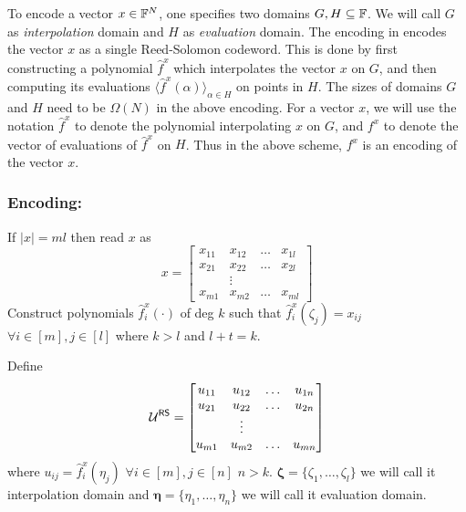 To encode a vector $x\in \mathbb{F}^N$, one specifies two domains $G,H\subseteq \mathbb{F}$.
We will call $G$ as {\em interpolation} domain and $H$ as {\em evaluation} domain.
The encoding in \cite{Aurora} encodes the vector $x$ as a single Reed-Solomon
codeword. This is done by first constructing a polynomial $\hat{f}^x$ which
interpolates the vector $x$ on $G$, and then computing its evaluations
$\langle \hat{f}^x(\alpha) \rangle_{\alpha\in H}$ on points in $H$. The sizes
of domains $G$ and $H$ need to be $\Omega(N)$ in the above encoding. For a
vector $x$, we will use the notation $\hat{f}^x$ to denote the polynomial
interpolating $x$ on $G$, and $f^x$ to denote the vector of evaluations of
$\hat{f}^x$ on $H$. Thus in the above scheme, $f^x$ is an encoding of the
vector $x$.

\begin{comment}
An alternative encoding used in \cite{Ligero2017} encodes parts of a vector
separately, and thus the encoded vector corresponds to a set of Reed-Solomon
codewords, or a single codeword of an Interleaved Reed-Solomon code(see
Definition \ref{defn:interleaved}). More specifically, one chooses integers $m$
and $\ell$ such that $m\ell > N$ and domains $G$ and $H$ of size
$\Omega(\ell)$. The vector $x\in \FF^N$ is written as
$x=(x_1|\cdots|x_m)$ where $x_i\in \FF^l$ for all $i\in [m]$. The vector $x$ is
encoded as $(f^x_1,\ldots,f^x_m)$ where $f^x_i$ encodes $x_i$ as described
before, i.e $f^x_i=\langle \hat{f}^x_i(\alpha)\rangle_{\alpha\in H}$ where the
polynomial $\hat{f}^x_i$ interpolates the vector $x_i$ on $G$. 
\end{comment}
\subsubsection{Encoding:}\label{subsec: encode} 
If $|x|=ml$ then read $x$ as 
$$x=
\begin{bmatrix}
x_{11} & x_{12} & \ldots & x_{1l}\\
x_{21} & x_{22} & \ldots & x_{2l}\\
& \vdots\\
x_{m1} & x_{m2} & \ldots & x_{ml}
\end{bmatrix}
$$	
Construct polynomials $\hat{f}^x_i(\cdot)$ of deg $k$ such that $\hat{f}^x_i(\zeta_j)=x_{ij}$ $\forall i\in [m], j\in [l]$ where $k>l$ and $l+t=k$.

Define 
$$ \mathcal{U}^{\mathsf{RS}} =
\begin{bmatrix}
u_{11} & u_{12} & \ldots & u_{1n}\\
u_{21} & u_{22} & \ldots & u_{2n}\\
& \vdots\\
u_{m1} & u_{m2} & \ldots & u_{mn}
\end{bmatrix}
$$
where $u_{ij}= \hat{f}^x_i(\eta_j)$ $\forall i\in[m], j\in[n]$ $n>k$. $\bm{\zeta}=\{\zeta_1,\ldots,\zeta_l\}$ we will call it interpolation domain and $\bm{\eta} = \{\eta_1,\ldots,\eta_n\}$ we will call it evaluation domain. 

